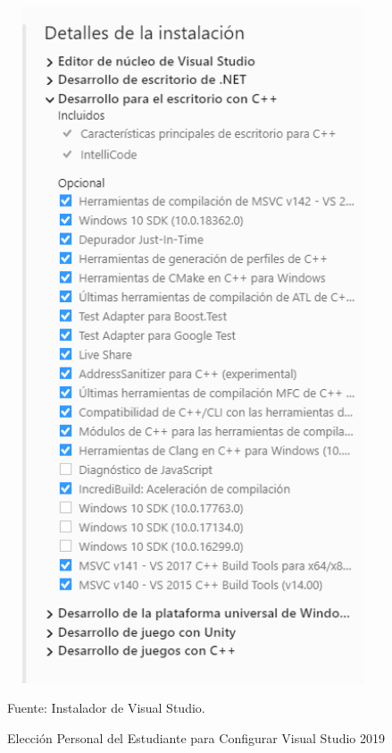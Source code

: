 \newpage
\begin{figure}[b!]
	\centering
	\includegraphics[width=11cm,height=20cm,]{./Images/eleccionesvsinstall.png}
	\caption{Elección Personal del Estudiante para Configurar Visual Studio 2019}
	\footnotesize Fuente: Instalador de Visual Studio.
	\label{vsinstall}
\end{figure}


